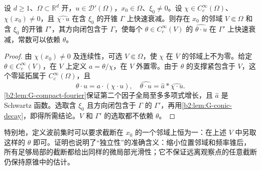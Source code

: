 \begin{proposition}[空间截断的独立性]\label{b2:prop:G-cutoff}
设 \(d\ge1\)、\(\Omega\subset\mathbb R^d\) 开，\(u\in\mathcal D'(\Omega)\)，\(x_0\in\Omega\)、\(\xi_0\ne0\)。设 \(\chi\in C_c^\infty(\Omega)\)、\(\chi(x_0)\ne0\)，且 \(\widehat{\chi\cdot u}\) 在含 \(\xi_0\) 的开锥 \(\Gamma\) 上快速衰减。则存在 \(x_0\) 的邻域 \(V\Subset\Omega\) 和含 \(\xi_0\) 的开锥 \(\Gamma'\)，其方向闭包含于 \(\Gamma\)，使每个 \(\theta\in C_c^\infty(V)\) 的 \(\widehat{\theta\cdot u}\) 在 \(\Gamma'\) 上快速衰减，常数可以依赖 \(\theta\)。
\end{proposition}
\begin{proof}
由 \(\chi(x_0)\ne0\) 及连续性，可选 \(V\Subset\Omega\)，使 \(\chi\) 在 \(\overline V\) 的邻域上不为零。给定 \(\theta\in C_c^\infty(V)\)，在 \(V\) 上定义 \(a=\theta/\chi\)，在 \(V\) 外置零。由于 \(\theta\) 的支撑紧包含于 \(V\)，这个零延拓属于 \(C_c^\infty(\Omega)\)，且
\[
 \theta\cdot u=a\cdot(\chi\cdot u),
 \quad
 \widehat{\theta\cdot u}
   =\widehat a*\widehat{\chi\cdot u}.
\]
\cref{b2:lem:G-compact-fourier}保证第二个因子全局至多多项式增长，且 \(\widehat a\) 是 Schwartz 函数。选取含 \(\xi_0\) 且方向闭包含于 \(\Gamma\) 的 \(\Gamma'\)，再用\cref{b2:lem:G-conic-decay}，即得所需结论。\(V\) 和 \(\Gamma'\) 的选取都不依赖 \(\theta\)。
\end{proof}
特别地，定义波前集时可以要求截断在 \(x_0\) 的一个邻域上恒为一：在上述 \(V\) 中另取这样的 \(\theta\) 即可。证明也说明了“独立性”的准确含义：缩小位置邻域和频率锥后，所有足够局部的截断都给出同样的微局部光滑性；它不保证远离观察点的任意截断仍保持原锥中的估计。

